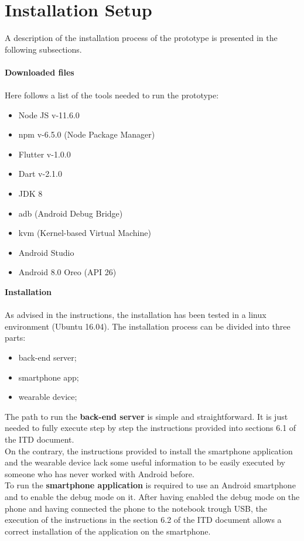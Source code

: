 \section{Installation Setup}
A description of the installation process of the prototype is presented in the following subsections.\\\\
\textbf{Downloaded files}\\\\
Here follows a list of the tools needed to run the prototype:
\begin{itemize}
	\item Node JS v-11.6.0
	\item npm v-6.5.0 (Node Package Manager)
	\item Flutter v-1.0.0	
	\item Dart v-2.1.0	
	\item JDK 8
	\item adb (Android Debug Bridge)
	\item kvm (Kernel-based Virtual Machine)
	\item Android Studio
	\item Android 8.0 Oreo (API 26)\\
\end{itemize}
\textbf{Installation}\\\\
As advised in the instructions, the installation has been tested in a linux environment (Ubuntu 16.04).
The installation process can be divided into three parts:
\begin{itemize}
	\item back-end server;
	\item smartphone app;
	\item wearable device;
\end{itemize}
The path to run the \textbf{back-end server} is simple and straightforward. It is just needed to fully execute step by step the instructions provided into sections 6.1 of the ITD document.\\
On the contrary, the instructions provided to install the smartphone application and the wearable device lack some useful information to be easily executed by someone who has never worked with Android before.\\
To run the \textbf{smartphone application} is required to use an Android smartphone and to enable the debug mode on it. After having enabled the debug mode on the phone and having connected the phone to the notebook trough USB, the execution of the instructions in the section 6.2 of the ITD document allows a correct installation of the application on the smartphone.\\
